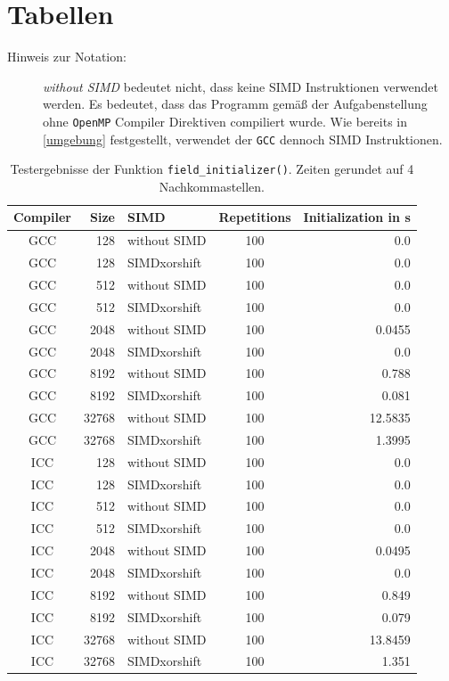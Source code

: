 \documentclass[german,plainarticle,hyperref,utf8]{zihpub}
\begin{document}
	\section{Tabellen} \label{tables}
	\begin{description}
		\item[Hinweis zur Notation:] \textit{without SIMD} bedeutet nicht, dass keine SIMD Instruktionen verwendet werden. Es bedeutet, dass das Programm gemäß der Aufgabenstellung ohne \texttt{OpenMP} Compiler Direktiven compiliert wurde. Wie bereits in \ref{umgebung} festgestellt, verwendet der \texttt{GCC} dennoch SIMD Instruktionen.
	\end{description}
	\begin{table}[h]
		\centering
			\begin{tabular}{|| c r l c r ||}
				\hline
				Compiler & Size  & SIMD & Repetitions & Initialization in s \\ [1ex]
				\hline\hline
				GCC & 128 & without SIMD & 100 & 0.0 \\ \hline
				GCC & 128 & SIMDxorshift & 100 & 0.0 \\ \hline
				GCC & 512 & without SIMD & 100 & 0.0 \\ \hline
				GCC & 512 & SIMDxorshift & 100 & 0.0 \\ \hline
				GCC & 2048 & without SIMD & 100 & 0.0455 \\ \hline
				GCC & 2048 & SIMDxorshift & 100 & 0.0 \\ \hline
				GCC & 8192 & without SIMD & 100 & 0.788 \\ \hline
				GCC & 8192 & SIMDxorshift & 100 & 0.081 \\ \hline
				GCC & 32768 & without SIMD & 100 & 12.5835 \\ \hline
				GCC & 32768 & SIMDxorshift & 100 & 1.3995 \\ \hline \hline
				ICC & 128 & without SIMD & 100 & 0.0 \\ \hline
				ICC & 128 & SIMDxorshift & 100 & 0.0 \\ \hline
				ICC & 512 & without SIMD & 100 & 0.0 \\ \hline
				ICC & 512 & SIMDxorshift & 100 & 0.0 \\ \hline
				ICC & 2048 & without SIMD & 100 & 0.0495 \\ \hline
				ICC & 2048 & SIMDxorshift & 100 & 0.0 \\ \hline
				ICC & 8192 & without SIMD & 100 & 0.849 \\ \hline
				ICC & 8192 & SIMDxorshift & 100 & 0.079 \\ \hline
				ICC & 32768 & without SIMD & 100 & 13.8459 \\ \hline
				ICC & 32768 & SIMDxorshift & 100 & 1.351 \\ \hline
			\end{tabular}
			\caption{\label{tab:init}Testergebnisse der Funktion \texttt{field\_initializer()}. Zeiten gerundet auf 4 Nachkommastellen.}
	\end{table}
\end{document}
